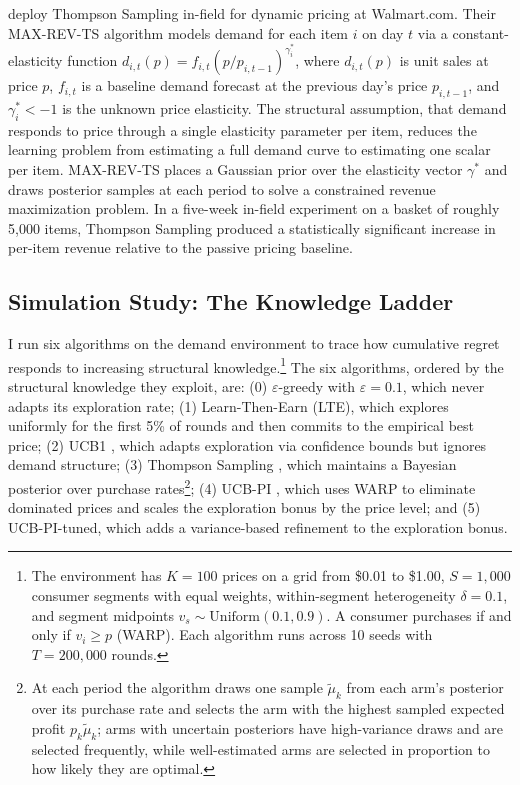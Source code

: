 \citet{Ganti2018} deploy Thompson Sampling in-field for dynamic pricing at Walmart.com. Their MAX-REV-TS algorithm models demand for each item $i$ on day $t$ via a constant-elasticity function $d_{i,t}(p) = f_{i,t}(p/p_{i,t-1})^{\gamma_i^*}$, where $d_{i,t}(p)$ is unit sales at price $p$, $f_{i,t}$ is a baseline demand forecast at the previous day's price $p_{i,t-1}$, and $\gamma_i^* < -1$ is the unknown price elasticity. The structural assumption, that demand responds to price through a single elasticity parameter per item, reduces the learning problem from estimating a full demand curve to estimating one scalar per item. MAX-REV-TS places a Gaussian prior over the elasticity vector $\gamma^*$ and draws posterior samples at each period to solve a constrained revenue maximization problem. In a five-week in-field experiment on a basket of roughly 5,000 items, Thompson Sampling produced a statistically significant increase in per-item revenue relative to the passive pricing baseline.

\subsection{Simulation Study: The Knowledge Ladder}
\label{sec:bandit_sim}

I run six algorithms on the \citet{Misra2019} demand environment to trace how cumulative regret responds to increasing structural knowledge.\footnote{The environment has $K = 100$ prices on a grid from \$0.01 to \$1.00, $S = 1{,}000$ consumer segments with equal weights, within-segment heterogeneity $\delta = 0.1$, and segment midpoints $v_s \sim \mathrm{Uniform}(0.1, 0.9)$. A consumer purchases if and only if $v_i \geq p$ (WARP). Each algorithm runs across 10 seeds with $T = 200{,}000$ rounds.} The six algorithms, ordered by the structural knowledge they exploit, are: (0) $\varepsilon$-greedy with $\varepsilon = 0.1$, which never adapts its exploration rate; (1) Learn-Then-Earn (LTE), which explores uniformly for the first 5\% of rounds and then commits to the empirical best price; (2) UCB1 \citep{auer2002}, which adapts exploration via confidence bounds but ignores demand structure; (3) Thompson Sampling \citep{Thompson1933}, which maintains a Bayesian posterior over purchase rates\footnote{At each period the algorithm draws one sample $\tilde{\mu}_k$ from each arm's posterior over its purchase rate and selects the arm with the highest sampled expected profit $p_k \tilde{\mu}_k$; arms with uncertain posteriors have high-variance draws and are selected frequently, while well-estimated arms are selected in proportion to how likely they are optimal.}; (4) UCB-PI \citep{Misra2019}, which uses WARP to eliminate dominated prices and scales the exploration bonus by the price level; and (5) UCB-PI-tuned, which adds a variance-based refinement to the exploration bonus.

